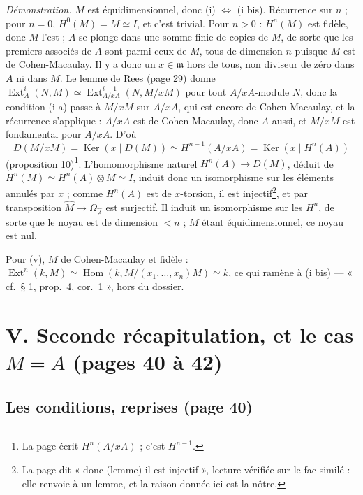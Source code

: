 \documentclass[11pt,a4paper]{article}
\begin{document}
\emph{Démonstration.} $M$ est équidimensionnel, donc (i) $\Leftrightarrow$
(i bis). Récurrence sur $n$ ; pour $n = 0$, $H^0(M) = M \simeq I$, et c'est
trivial. Pour $n > 0$ : $H^n(M)$ est fidèle, donc $M$ l'est ; $A$ se plonge
dans une somme finie de copies de $M$, de sorte que les premiers associés de
$A$ sont parmi ceux de $M$, tous de dimension $n$ puisque $M$ est de
Cohen-Macaulay. Il y a donc un $x \in \mathfrak{m}$ hors de tous, non diviseur
de zéro dans $A$ ni dans $M$. Le lemme de Rees (page 29) donne
$\operatorname{Ext}^i_A(N, M) \simeq \operatorname{Ext}^{i-1}_{A/xA}(N, M/xM)$
pour tout $A/xA$-module $N$, donc la condition (i a) passe à $M/xM$ sur $A/xA$,
qui est encore de Cohen-Macaulay, et la récurrence s'applique : $A/xA$ est de
Cohen-Macaulay, donc $A$ aussi, et $M/xM$ est fondamental pour $A/xA$. D'où
\[
  D(M/xM) = \operatorname{Ker}(x \mid D(M)) \simeq H^{n-1}(A/xA) =
  \operatorname{Ker}(x \mid H^n(A))
\]
(proposition 10)\footnote{La page écrit $H^n(A/xA)$ ; c'est $H^{n-1}$.}.
L'homomorphisme naturel $H^n(A) \to D(M)$, déduit de $H^n(M) \simeq H^n(A)
\otimes M \simeq I$, induit donc un isomorphisme sur les éléments annulés par
$x$ ; comme $H^n(A)$ est de $x$-torsion, il est injectif\footnote{La page dit « donc (lemme) il est injectif », lecture vérifiée sur le fac-similé : elle renvoie à un lemme, et la raison donnée ici est la nôtre.}, et par transposition
$\widehat{M} \to \Omega_{\widehat{A}}$ est surjectif. Il induit un isomorphisme
sur les $H^n$, de sorte que le noyau est de dimension $< n$ ; $M$ étant
équidimensionnel, ce noyau est nul.

Pour (v), $M$ de Cohen-Macaulay et fidèle : $\operatorname{Ext}^n(k, M) \simeq
\operatorname{Hom}(k, M/(x_1, \ldots, x_n)M) \simeq k$, ce qui ramène à (i bis)
--- « cf.\ § 1, prop.\ 4, cor.\ 1 », hors du dossier.

\section*{V. Seconde récapitulation, et le cas $M = A$ (pages 40 à 42)}

\subsection*{Les conditions, reprises (page 40)}
\end{document}
